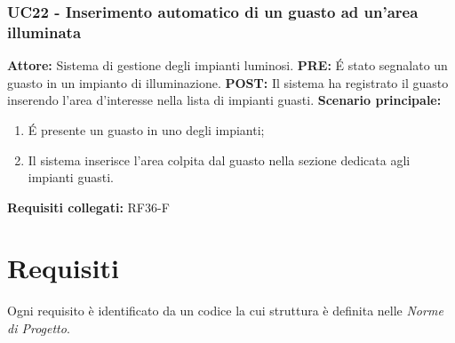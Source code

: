 \documentclass[a4paper, 12pt]{article}
\begin{document}
\subsubsection{UC22 - Inserimento automatico di un guasto ad un'area illuminata}
\textbf{Attore:} Sistema di gestione degli impianti luminosi.\newline
\textbf{PRE:} \'E stato segnalato un guasto in un impianto di illuminazione.\newline
\textbf{POST:} Il sistema ha registrato il guasto inserendo l'area d'interesse nella lista di impianti guasti. \newline
\textbf{Scenario principale:}
\begin{enumerate}
    \item \'E presente un guasto in uno degli impianti;
    \item Il sistema inserisce l'area colpita dal guasto nella sezione dedicata agli impianti guasti.
\end{enumerate}
\textbf{Requisiti collegati:} RF36-F\newline

\newpage
\section{Requisiti}
Ogni requisito è identificato da un codice la cui struttura è definita nelle \textit{Norme di Progetto}.
\end{document}
